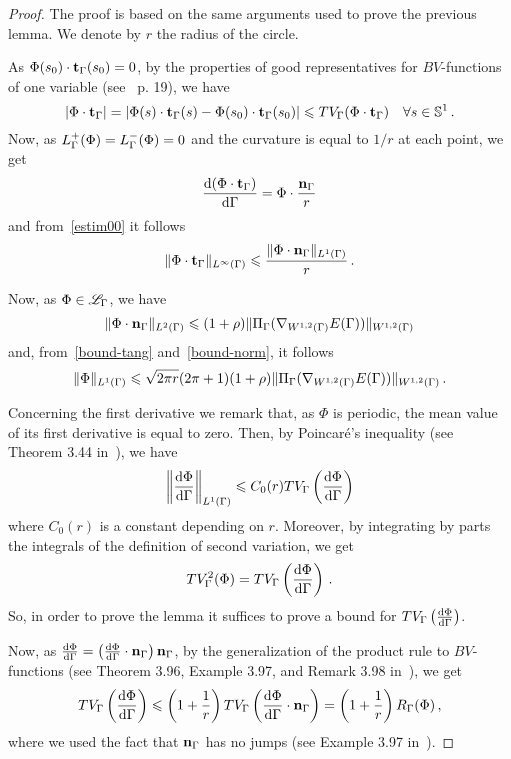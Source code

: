 \begin{proof}
 The proof is based on the same arguments used to prove the previous lemma. We denote by $r$ the radius of the circle.
\par As $\Phi(s_0)\cdot\mathbf{t}_\Gamma(s_0)=0$, 
by the properties of good representatives for  $BV$-functions of one variable (see~\cite{AFP} p. 19), we have 
\begin{equation}\label{estim00}
|\Phi\cdot\mathbf{t}_\Gamma|=|\Phi(s)\cdot\mathbf{t}_\Gamma(s)-\Phi(s_0)\cdot\mathbf{t}_\Gamma(s_0)|\leqslant TV_\Gamma(\Phi\cdot\mathbf{t}_\Gamma)\quad \forall s\in \mathbb{S}^1\,.
\end{equation}
Now, as $L_\Gamma^+(\Phi)=L_\Gamma^-(\Phi)=0$ and the curvature is equal to $1/r$ at each point, we get 
$$\frac{\mathrm{d} (\Phi\cdot\mathbf{t}_\Gamma)}{\mathrm{d}\Gamma} = \Phi\cdot\frac{\mathbf{n}_\Gamma}{r}$$
and from~\eqref{estim00} it follows 
\begin{equation}\label{bound-tang} \|\Phi\cdot\mathbf{t}_\Gamma\|_{L^{\infty}(\Gamma)}\leqslant \frac{ \|\Phi\cdot\mathbf{n}_\Gamma\|_{L^{1}(\Gamma)}}{r}\,.
\end{equation}
\par Now, as $\Phi\in \mathcal{L}_\Gamma$, we have  
\begin{equation}\label{bound-norm}
\|\Phi\cdot\mathbf{n}_\Gamma\|_{L^{2}(\Gamma)}\leqslant (1+\rho) \|\Pi_\Gamma(\nabla_{W^{1,2}(\Gamma)}E(\Gamma))\|_{W^{1,2}(\Gamma)}
\end{equation}
and, from~\eqref{bound-tang} and~\eqref{bound-norm}, it follows
\begin{equation}\label{estim0}
 \|\Phi\|_{L^{1}(\Gamma)}\leqslant \sqrt{2\pi r}(2\pi +1)(1+\rho) \|\Pi_\Gamma(\nabla_{W^{1,2}(\Gamma)}E(\Gamma))\|_{W^{1,2}(\Gamma)}\,.
 \end{equation}
\par  Concerning the first derivative we remark that, as $\Phi$ is periodic, the mean value of its first derivative is equal to zero. Then, by Poincar\'e's inequality (see Theorem 3.44 in~\cite{AFP}), we have 
\begin{equation}\label{estim1} \left\|\frac{\mathrm{d} \Phi}{\mathrm{d}\Gamma}\right\|_{L^{1}(\Gamma)}\leqslant C_0(r) TV_\Gamma\left(\frac{\mathrm{d} \Phi}{\mathrm{d}\Gamma}\right) 
\end{equation}
where $C_0(r)$ is a constant depending on $r$. Moreover, by integrating by parts the integrals of the definition of second variation, we get 
\begin{equation}\label{estim2}
TV^2_\Gamma(\Phi) =  TV_\Gamma\left(\frac{\mathrm{d}\Phi}{\mathrm{d}\Gamma}\right)\,.
\end{equation}
So, in order to prove the lemma it suffices to prove a bound for  $TV_\Gamma\left(\frac{\mathrm{d}\Phi}{\mathrm{d}\Gamma}\right)$. 
\par Now, as $\frac{\mathrm{d} \Phi}{\mathrm{d}\Gamma}=\left(\frac{\mathrm{d} \Phi}{\mathrm{d}\Gamma}\cdot \mathbf{n}_\Gamma\right)\mathbf{n}_\Gamma$,  by the generalization of the  product rule  to  $BV$-functions (see Theorem 3.96, Example 3.97, and Remark 3.98 in~\cite{AFP}), we get 
\begin{equation}\label{estim30}
TV_\Gamma\left(\frac{\mathrm{d} \Phi}{\mathrm{d}\Gamma}\right)\leqslant \left(1+\frac{1}{r}\right) TV_\Gamma\left(\frac{\mathrm{d} \Phi}{\mathrm{d}\Gamma}\cdot \mathbf{n}_\Gamma\right)= \left(1+\frac{1}{r}\right) R_\Gamma(\Phi) \,,
\end{equation}
where we used the fact that $\mathbf{n}_\Gamma$ has no jumps (see Example 3.97 in~\cite{AFP}).


\end{proof}
